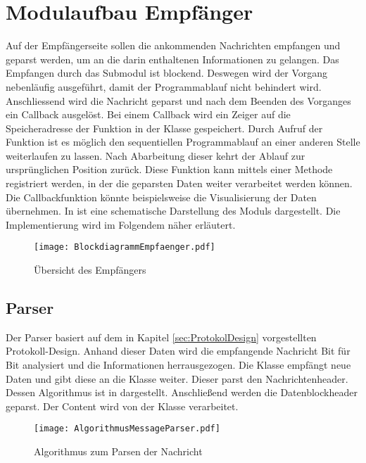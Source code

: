 \section{Modulaufbau Empf{\"a}nger}

Auf der Empf{\"a}ngerseite sollen die ankommenden Nachrichten empfangen und geparst
werden, um an die darin enthaltenen Informationen zu gelangen. Das Empfangen
durch das Submodul  ist blockend. Deswegen wird der Vorgang
nebenl{\"a}ufig ausgef{\"u}hrt, damit der Programmablauf nicht behindert wird. Anschliessend wird
die Nachricht geparst und nach dem Beenden des Vorganges ein Callback
 ausgel{\"o}st. Bei einem Callback wird
ein Zeiger auf die Speicheradresse der Funktion in der Klasse gespeichert. Durch
Aufruf der Funktion ist es m{\"o}glich den sequentiellen Programmablauf an einer
anderen Stelle weiterlaufen zu lassen. Nach Abarbeitung dieser kehrt der Ablauf
zur urspr{\"u}nglichen Position zur{\"u}ck. Diese Funktion kann mittels einer Methode
registriert werden, in der die geparsten Daten weiter verarbeitet werden k{\"o}nnen.
Die Callbackfunktion k{\"o}nnte beispielsweise die Visualisierung der Daten
{\"u}bernehmen. \newline 
In  ist eine schematische Darstellung des
Moduls dargestellt. Die Implementierung wird im Folgendem n{\"a}her erl{\"a}utert.

\begin{figure}[H]
\centering
\texttt{[image: BlockdiagrammEmpfaenger.pdf]}
\caption{{\"U}bersicht des Empf{\"a}ngers}
\label{fig:BlockdiagrammEmpfaenger}
\end{figure}

\subsection{Parser}

Der Parser basiert auf dem in Kapitel \ref{sec:ProtokolDesign}
vorgestellten Protokoll-Design.
Anhand dieser Daten wird die empfangende Nachricht Bit f{\"u}r Bit analysiert
und die Informationen herrausgezogen. 
Die Klasse  empf{\"a}ngt neue Daten und gibt diese an
die Klasse  weiter. Dieser parst den Nachrichtenheader.
Dessen Algorithmus ist in  dargestellt.
Anschlie{\ss}end werden die Datenblockheader geparst. Der Content wird von der
Klasse  verarbeitet.

\begin{figure}[H]
\centering
\texttt{[image: AlgorithmusMessageParser.pdf]}
\caption{Algorithmus zum Parsen der Nachricht}
\label{fig:AlgorithmusMessageParser}
\end{figure}

